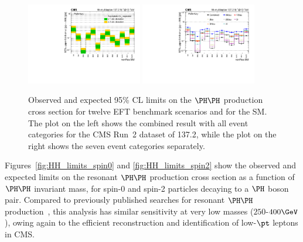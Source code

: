 \begin{figure}
  \centering
  \includegraphics[width=0.45\textwidth]{figures/bmScan_multilepton_RUN2.pdf}
  \hspace{0.05\textwidth}
  \includegraphics[width=0.45\textwidth]{figures/multiBMScan_multilepton_Run2.pdf}
  \caption{
    Observed and expected 95\% CL limits on the $\HH$ production cross section for
    twelve EFT benchmark scenarios and for the SM.
    The plot on the left shows the combined result with all event categories for
    the CMS Run~2 dataset of 137.2\fbinv, while the plot on the right shows the
    seven event categories separately.
  }
  \label{fig:HH_limits_EFT}
\end{figure}

Figures~\ref{fig:HH_limits_spin0} and \ref{fig:HH_limits_spin2} show the observed and
expected limits on the resonant $\HH$ production cross section as a function of
$\HH$ invariant mass, for spin-0 and spin-2 particles decaying to a $\PHiggs$ boson pair.
Compared to previously published searches for resonant $\HH$
production~\cite{Sirunyan:2018ayu,2020135103},
this analysis has similar sensitivity at very low masses ($250$-$400\GeV$),
owing again to the efficient reconstruction and identification of low-$\pt$ leptons in CMS.

